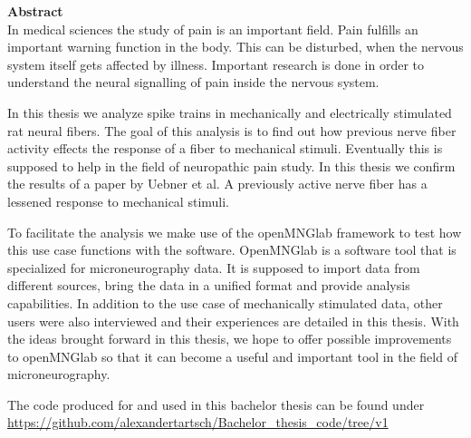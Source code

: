 \vspace*{2cm}

{\bf\Large Abstract} \\ [1em]
In medical sciences the study of pain is an important field. Pain fulfills an important warning function in the body. This can be disturbed, when the nervous system itself gets affected by illness. Important research is done in order to understand the neural signalling of pain inside the nervous system.

In this thesis we analyze spike trains in mechanically and electrically stimulated rat neural fibers. The goal of this analysis is to find out how previous nerve fiber activity effects the response of a fiber to mechanical stimuli. Eventually this is supposed to help in the field of neuropathic pain study. In this thesis we confirm the results of a paper by Uebner et al. A previously active nerve fiber has a lessened response to mechanical stimuli.

To facilitate the analysis we make use of the openMNGlab framework to test how this use case functions with the software. OpenMNGlab is a software tool that is specialized for microneurography data. It is supposed to import data from different sources, bring the data in a unified format and provide analysis capabilities. In addition to the use case of mechanically stimulated data, other users were also interviewed and their experiences are detailed in this thesis. With the ideas brought forward in this thesis, we hope to offer possible improvements to openMNGlab so that it can become a useful and important tool in the field of microneurography.

The code produced for and used in this bachelor thesis can be found under \url{https://github.com/alexandertartsch/Bachelor_thesis_code/tree/v1}

\cleardoublepage
